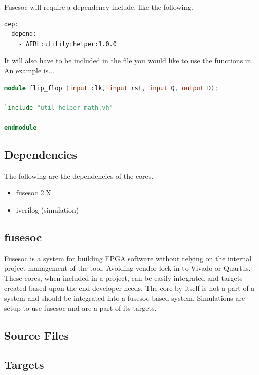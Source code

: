 \par Fusesoc will require a dependency include, like the following.
\begin{lstlisting}[language=XML]
dep:
  depend:
    - AFRL:utility:helper:1.0.0
\end{lstlisting}

It will also have to be included in the file you would like to use the functions in. An example is...
\begin{lstlisting}[language=Verilog]
module flip_flop (input clk, input rst, input Q, output D);

`include "util_helper_math.vh"

endmodule
\end{lstlisting}

\subsection{Dependencies}

\par
The following are the dependencies of the cores.

\begin{itemize}
  \item fusesoc 2.X
  \item iverilog (simulation)
\end{itemize}

\subsection{fusesoc}
\par
Fusesoc is a system for building FPGA software without relying on the internal project management of the tool. Avoiding vendor lock in to Vivado or Quartus.
These cores, when included in a project, can be easily integrated and targets created based upon the end developer needs. The core by itself is not a part of
a system and should be integrated into a fusesoc based system. Simulations are setup to use fusesoc and are a part of its targets.

\subsection{Source Files}



\subsection{Targets} \label{targets}

